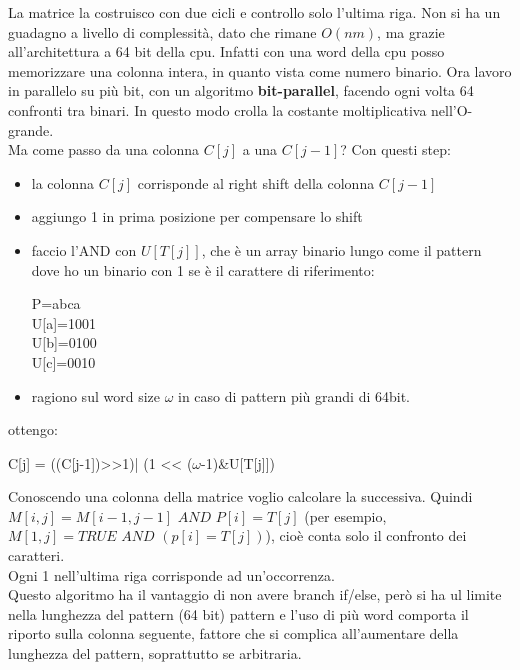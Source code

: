 \documentclass[a4paper,12pt, oneside]{book}
\begin{document}
La matrice la costruisco con due cicli e controllo solo l'ultima riga.
Non si ha un guadagno a livello di complessità, dato che rimane
$O(nm)$, ma grazie all'architettura a 64 bit della cpu. Infatti con una word
della cpu posso memorizzare una colonna intera, in quanto vista come numero
binario. Ora lavoro in parallelo su più bit, con un algoritmo
\textbf{bit-parallel}, facendo ogni volta 64 confronti tra binari. In
questo modo crolla la costante moltiplicativa nell'O-grande.\\
Ma come passo da una colonna $C[j]$ a una $C[j-1]$? Con questi step:
\begin{itemize}
  \item la colonna $C[j]$ corrisponde al right shift della colonna $C[j-1]$
  \item aggiungo 1 in prima posizione per compensare lo shift
  \item faccio l'AND con $U[T[j]]$, che è un array binario lungo come
  il pattern dove ho un binario con 1 se è il carattere  di
  riferimento:
  \begin{center}
    P=abca\\
    U[a]=1001\\
    U[b]=0100\\
    U[c]=0010\\
  \end{center}
  \item ragiono sul word size $\omega$ in caso di pattern più grandi
  di 64bit.
\end{itemize}
ottengo:
\begin{center}
  C[j] = ((C[j-1])>>1)| (1 << ($\omega$-1)\&U[T[j]])
\end{center}
Conoscendo una colonna della matrice voglio calcolare la successiva. 
Quindi $M[i,j]=M[i-1,j-1]\,\,AND\,\,P[i]=T[j]$ (per esempio, 
$M[1,j]=TRUE\,\,AND\,\,(p[i]=T[j])$), cioè conta solo il
confronto dei caratteri. \\
Ogni 1 nell'ultima riga corrisponde ad un'occorrenza. \\ 
Questo algoritmo ha il vantaggio di non avere branch if/else, 
però si ha ul limite nella lunghezza del pattern (64 bit) pattern 
e l'uso di più word comporta il riporto sulla colonna
seguente, fattore che si complica all'aumentare della lunghezza del
pattern, soprattutto se arbitraria.
\end{document}
